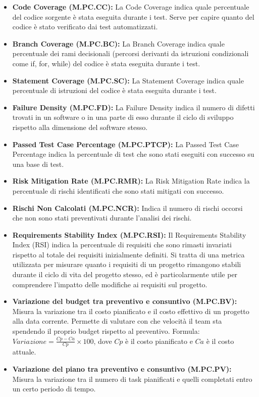 \begin{itemize}
    \item \textbf{Code Coverage (M.PC.CC):} La Code Coverage indica quale percentuale del codice sorgente è stata eseguita durante i test. Serve per capire quanto del codice è stato verificato dai test automatizzati.
    \item \textbf{Branch Coverage (M.PC.BC):} La Branch Coverage indica quale percentuale dei rami decisionali (percorsi derivanti da istruzioni condizionali come if, for, while) del codice è stata eseguita durante i test.
    \item \textbf{Statement Coverage (M.PC.SC):} La Statement Coverage indica quale percentuale di istruzioni del codice è stata eseguita durante i test.
    \item \textbf{Failure Density (M.PC.FD):} La Failure Density indica il numero di difetti trovati in un software o in una parte di esso durante il ciclo di sviluppo rispetto alla dimensione del software stesso.
    \item \textbf{Passed Test Case Percentage (M.PC.PTCP):} La Passed Test Case Percentage indica la percentuale di test che sono stati eseguiti con successo su una base di test.
    \item \textbf{Risk Mitigation Rate (M.PC.RMR):} La Risk Mitigation Rate indica la percentuale di rischi identificati che sono stati mitigati con successo.
    \item \textbf{Rischi Non Calcolati (M.PC.NCR):} Indica il numero di rischi occorsi che non sono stati preventivati durante l’analisi dei rischi.
    \item \textbf{Requirements Stability Index (M.PC.RSI):} Il Requirements Stability Index (RSI) indica la percentuale di requisiti che sono rimasti invariati rispetto al totale dei requisiti inizialmente definiti. Si tratta di una metrica utilizzata per misurare quanto i requisiti di un progetto rimangono stabili durante il ciclo di vita del progetto stesso, ed è particolarmente utile per comprendere l’impatto delle modifiche ai requisiti sul progetto.
    \item \textbf{Variazione del budget tra preventivo e consuntivo (M.PC.BV):} Misura la variazione tra il costo pianificato e il costo effettivo di un progetto alla data corrente. Permette di valutare con che velocità il team sta spendendo il proprio budget rispetto al preventivo. Formula: $Variazione = \frac{Cp - Ca}{Cp} \times 100$, dove $Cp$ è il costo pianificato e $Ca$ è il costo attuale.
    \item \textbf{Variazione del piano tra preventivo e consuntivo (M.PC.PV):} Misura la variazione tra il numero di task pianificati e quelli completati entro un certo periodo di tempo.
\end{itemize}


